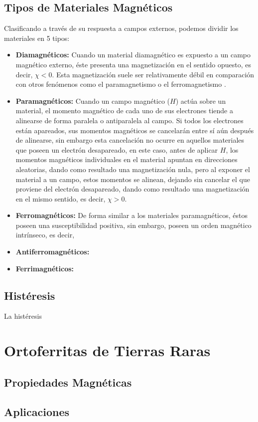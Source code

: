 \documentclass[../main.tex]{subfiles}
\begin{document}
\subsection{Tipos de Materiales Magnéticos}
Clasificando a través de su respuesta a campos externos, podemos dividir los materiales en 5 tipos:
\begin{itemize}
\item \textbf{Diamagnéticos:} Cuando un material diamagnético es expuesto a un campo magnético externo, éste presenta una magnetización en el sentido opuesto, es decir, $\chi<0$. Esta magnetización suele ser relativamente débil en comparación con otros fenómenos como el paramagnetismo o el ferromagnetismo \cite{griffiths2023introduction}.
\item \textbf{Paramagnéticos:} Cuando un campo magnético ($H$) actúa sobre un material, el momento magnético de cada uno de sus electrones tiende a alinearse de forma paralela o antiparalela al campo. Si todos los electrones están apareados, sus momentos magnéticos se cancelarán entre sí aún después de alinearse, sin embargo esta cancelación no ocurre en aquellos materiales que poseen un electrón desapareado, en este caso, antes de aplicar $H$, los momentos magnéticos individuales en el material apuntan en direcciones aleatorias, dando como resultado una magnetización nula, pero al exponer el material a un campo, estos momentos se alinean, dejando sin cancelar el que proviene del electrón desapareado, dando como resultado una magnetización en el mismo sentido, es decir, $\chi>0$.
\item \textbf{Ferromagnéticos:} De forma similar a los materiales paramagnéticos, éstos poseen una susceptibilidad positiva, sin embargo, poseen un orden magnético intrínseco, es decir, 
\item \textbf{Antiferromagnéticos:}
\item \textbf{Ferrimagnéticos:} 
\end{itemize}
\subsection{Histéresis}
La histéresis 
\section{Ortoferritas de Tierras Raras}

\subsection{Propiedades Magnéticas}

\subsection{Aplicaciones}
\end{document}
